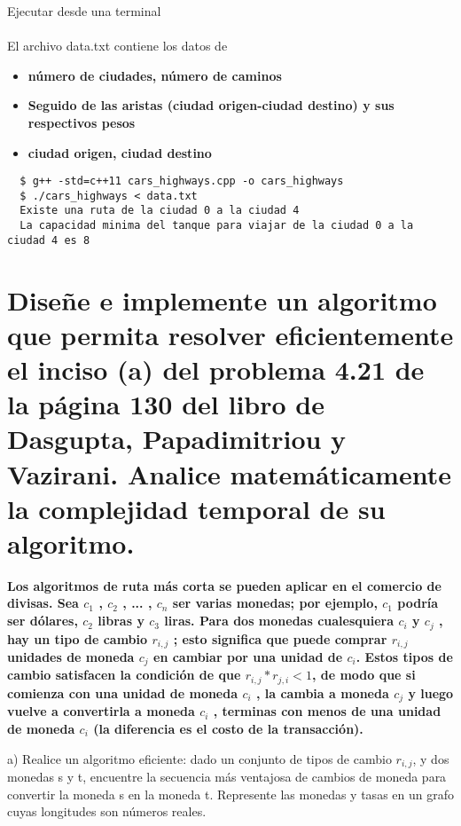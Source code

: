 \documentclass{article}
\begin{document}
Ejecutar desde una terminal\\\\

El archivo data.txt contiene los datos de
\begin{itemize}
\item \textbf{número de ciudades, número de caminos}
\item \textbf{Seguido de las aristas (ciudad origen-ciudad destino) y sus respectivos pesos}
\item \textbf{ciudad origen, ciudad destino}
\end{itemize}

\begin{commandline}
\begin{verbatim}
  $ g++ -std=c++11 cars_highways.cpp -o cars_highways
  $ ./cars_highways < data.txt
  Existe una ruta de la ciudad 0 a la ciudad 4
  La capacidad minima del tanque para viajar de la ciudad 0 a la ciudad 4 es 8
\end{verbatim}
\end{commandline}

\newpage
\section{Diseñe e implemente un algoritmo que permita resolver eficientemente el inciso (a) del problema 4.21 de la página 130 del libro de Dasgupta, Papadimitriou y Vazirani. Analice matemáticamente la complejidad temporal de su algoritmo.}

\begin{question}
  \textbf{Los algoritmos de ruta más corta se pueden aplicar en el comercio de divisas. Sea $c_{1}$ , $c_{2}$ , ... , $c_{n}$ ser varias monedas; por ejemplo, $c_{1}$ podría ser dólares, $c_{2}$ libras y $c_{3}$ liras. Para dos monedas cualesquiera $c_{i}$ y $c_{j}$ , hay un tipo de cambio $r_{i,j}$ ; esto significa que puede comprar $r_{i,j}$ unidades de moneda $c_{j}$ en cambiar por una unidad de $c_{i}$. Estos tipos de cambio satisfacen la condición de que $r_{i,j} * r_{j,i} < 1$, de modo que si comienza con una unidad de moneda $c_{i}$ , la cambia a moneda $c_{j}$ y luego vuelve a convertirla a moneda $c_{i}$ , terminas con menos de una unidad de moneda $c_{i}$ (la diferencia es el costo de la transacción).}

  a) Realice un algoritmo eficiente: dado un conjunto de tipos de cambio $r_{i,j}$, y dos monedas s y t, encuentre la secuencia más ventajosa de cambios de moneda para convertir la moneda s en la moneda t. Represente las monedas y tasas en un grafo cuyas longitudes son números reales.
  
\end{question}
\end{document}
